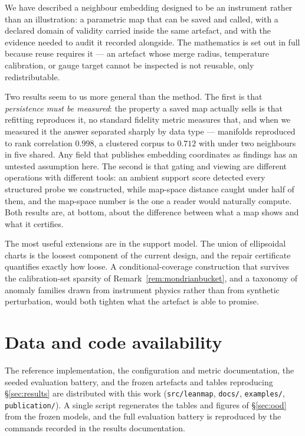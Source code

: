 \documentclass[12pt]{iopart}
\theoremstyle{definition}
\theoremstyle{plain}
\theoremstyle{remark}
\newcommand{\code}[1]{\texttt{#1}}
\begin{document}
We have described a neighbour embedding designed to be an instrument rather
than an illustration: a parametric map that can be saved and called, with a
declared domain of validity carried inside the same artefact, and with the
evidence needed to audit it recorded alongside. The mathematics is set out in
full because reuse requires it --- an artefact whose merge radius, temperature
calibration, or gauge target cannot be inspected is not reusable, only
redistributable.

Two results seem to us more general than the method. The first is that
\emph{persistence must be measured}: the property a saved map actually sells is
that refitting reproduces it, no standard fidelity metric measures that, and
when we measured it the answer separated sharply by data type --- manifolds
reproduced to rank correlation $0.998$, a clustered corpus to $0.712$ with
under two neighbours in five shared. Any field that publishes embedding
coordinates as findings has an untested assumption here. The second is that
gating and viewing are different operations with different tools: an ambient
support score detected every structured probe we constructed, while map-space
distance caught under half of them, and the map-space number is the one a reader
would naturally compute. Both results are, at bottom, about the difference
between what a map shows and what it certifies.

The most useful extensions are in the support model. The union of ellipsoidal
charts is the loosest component of the current design, and the repair
certificate quantifies exactly how loose. A conditional-coverage construction
that survives the calibration-set sparsity of Remark~\ref{rem:mondrianbucket},
and a taxonomy of anomaly families drawn from instrument physics rather than
from synthetic perturbation, would both tighten what the artefact is able to
promise.

\section*{Data and code availability}

The reference implementation, the configuration and metric documentation, the
seeded evaluation battery, and the frozen artefacts and tables reproducing
\S\ref{sec:results} are distributed with this work
(\code{src/leanmap}, \code{docs/}, \code{examples/}, \code{publication/}).
A single script regenerates the tables and figures of \S\ref{sec:ood} from the
frozen models, and the full evaluation battery is reproduced by the commands
recorded in the results documentation.
\end{document}
